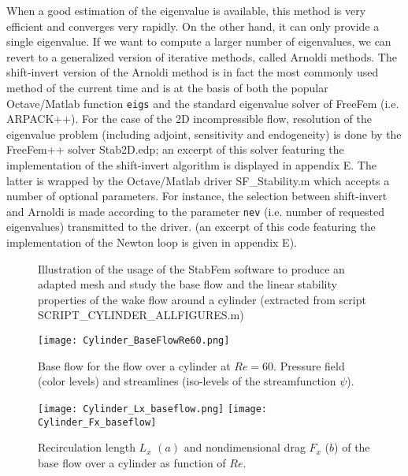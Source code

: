 \documentclass[twocolumn,10pt]{asme2ej}
\begin{document}
When a good estimation of the eigenvalue is available, this method is very efficient and converges very rapidly. On the other hand, it can only provide a single eigenvalue. If we want to compute a larger number of eigenvalues, we can revert to a generalized version of iterative methods, called Arnoldi methods\cite{Arnoldi51}. The shift-invert version of the Arnoldi method is in fact the most commonly used method of the current time and is at the basis of both the popular Octave/Matlab function {\tt{eigs}} and the standard eigenvalue solver of FreeFem (i.e. ARPACK++). 
For the case of the 2D incompressible flow, resolution of the eigenvalue problem (including adjoint, sensitivity and endogeneity) is done by the FreeFem++ solver {\sf  Stab2D.edp}; an excerpt of this solver featuring the implementation of the shift-invert algorithm is displayed in appendix E. The latter is wrapped by the Octave/Matlab driver {\sf  SF\_Stability.m} which accepts a number of optional parameters. For instance, the selection between shift-invert and Arnoldi is made according to the parameter \verb|nev|  (i.e. number of requested eigenvalues) transmitted to the driver.
(an excerpt of this code featuring the implementation of the Newton loop is given in appendix E).


\begin{figure*}[t]
\small

 \normalsize
\caption{Illustration of the usage of the StabFem software to produce an adapted mesh and study the base flow and the linear stability properties of the wake flow around a cylinder 
(extracted from script {\sf  SCRIPT\_CYLINDER\_ALLFIGURES.m})}
\label{Listing2}
\end{figure*}


\begin{figure}
\texttt{[image: Cylinder\_BaseFlowRe60.png]}
\caption{Base flow for the flow over a cylinder at $Re=60$. Pressure field (color levels) and streamlines (iso-levels of the streamfunction $\psi$). }
\label{fig:Baseflow}
\end{figure}

\begin{figure}
\texttt{[image: Cylinder\_Lx\_baseflow.png]}
\texttt{[image: Cylinder\_Fx\_baseflow]}
\caption{Recirculation length $L_x$ $(a)$  and nondimensional drag $F_x$ ($b$) of the base flow over a cylinder as function of $Re$.}
\label{fig:LxandDrag}
\end{figure}
\end{document}
